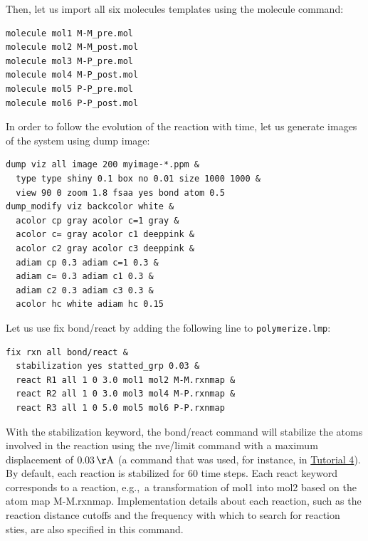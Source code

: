 \documentclass[9pt,tutorial]{livecoms}
\newcommand{\lmpcmd}[1]{\hspace{0pt}\colorbox{listing}{\textcolor{command}{\small{#1}}}\hspace{0pt}} %
\newcommand{\flecmd}[1]{\textcolor{command}{\texttt{#1}}} %
\begin{document}
Then, let us import all six molecules templates using the \lmpcmd{molecule} command:
\begin{lstlisting}
molecule mol1 M-M_pre.mol
molecule mol2 M-M_post.mol
molecule mol3 M-P_pre.mol
molecule mol4 M-P_post.mol
molecule mol5 P-P_pre.mol
molecule mol6 P-P_post.mol
\end{lstlisting}
In order to follow the evolution of the reaction with time, let us generate images
of the system using \lmpcmd{dump image}:
\begin{lstlisting}
dump viz all image 200 myimage-*.ppm &
  type type shiny 0.1 box no 0.01 size 1000 1000 &
  view 90 0 zoom 1.8 fsaa yes bond atom 0.5
dump_modify viz backcolor white &
  acolor cp gray acolor c=1 gray &
  acolor c= gray acolor c1 deeppink &
  acolor c2 gray acolor c3 deeppink &
  adiam cp 0.3 adiam c=1 0.3 &
  adiam c= 0.3 adiam c1 0.3 &
  adiam c2 0.3 adiam c3 0.3 &
  acolor hc white adiam hc 0.15
\end{lstlisting}

Let us use \lmpcmd{fix bond/react} by adding the following
line to \flecmd{polymerize.lmp}:
\begin{lstlisting}
fix rxn all bond/react &
  stabilization yes statted_grp 0.03 &
  react R1 all 1 0 3.0 mol1 mol2 M-M.rxnmap &
  react R2 all 1 0 3.0 mol3 mol4 M-P.rxnmap &
  react R3 all 1 0 5.0 mol5 mol6 P-P.rxnmap
\end{lstlisting}
With the \lmpcmd{stabilization} keyword, the \lmpcmd{bond/react} command will
stabilize the atoms involved in the reaction using the \lmpcmd{nve/limit}
command with a maximum displacement of $0.03\,\mathrm{\AA{}}$ (a command that was
used, for instance, in \hyperref[sheared-confined-label]{Tutorial 4}).  By default,
each reaction is stabilized for 60 time steps.  Each \lmpcmd{react} keyword
corresponds to a reaction, e.g.,~a transformation of \lmpcmd{mol1} into \lmpcmd{mol2}
based on the atom map \lmpcmd{M-M.rxnmap}.  Implementation details about each reaction,
such as the reaction distance cutoffs and the frequency with which to search for
reaction sties, are also specified in this command.
\end{document}
